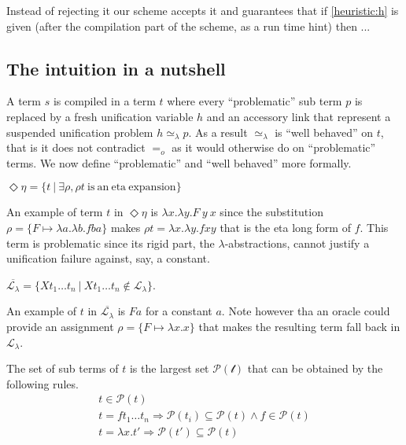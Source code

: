 \documentclass[sigconf,natbib=false,review]{acmart}
\newcommand{\EqualRel}{\ensuremath{=}}
\newcommand{\UnifRel}{\ensuremath{\simeq}}
\newcommand{\Eo}{\ensuremath{\EqualRel_o}\xspace}
\newcommand{\Ue}{\ensuremath{\UnifRel_\lambda}\xspace}
\newcommand{\llambda}{\ensuremath{\mathcal{L}_\lambda}\xspace}
\begin{document}
\noindent
Instead of rejecting it our scheme accepts it and guarantees that if
\ref{heuristic:h} is given (after the compilation part of the scheme, as
a run time hint) then ...


\subsection{The intuition in a nutshell}
\label{sec:nutshell}
A term $s$ is compiled in a term $t$ where every
``problematic'' sub term $p$ is replaced by a fresh unification variable $h$
and an accessory link that represent a suspended unification problem
$h \Ue p$. As a result \Ue is ``well behaved'' on $t$, that is it does not
contradict \Eo as it would otherwise do on ``problematic'' terms.
We now define ``problematic'' and ``well behaved'' more formally.

\newcommand{\maybeeta}{\ensuremath{\Diamond\eta}\xspace}
\newcommand{\maybebeta}{\ensuremath{\overline{\llambda}}\xspace}
\begin{definition}[\maybeeta]
  $\maybeeta = \{ t ~|~ \exists \rho, \rho t ~\mathrm{is~an~eta~expansion} \}$
\end{definition}

\noindent
An example of term $t$ in \maybeeta{} is
$\lambda x.\lambda y.F~y~x$
since the substitution
$\rho = \{ F \mapsto \lambda a.\lambda b.fba\}$
makes $\rho t = \lambda x.\lambda y.f x y$
that is the eta long form of $f$. This term is problematic since
its rigid part, the $\lambda$-abstractions, cannot justify a
unification failure against, say, a constant.

\begin{definition}[\maybebeta]
  $\maybebeta = \{ X t_1 \ldots t_n ~|~ X t_1 \ldots t_n \not\in \llambda \}$.
\end{definition}

\noindent
An example of $t$ in \maybebeta{} is $F a$ for a constant $a$. Note however tha
an oracle could provide an assignment $\rho = \{ F \mapsto \lambda x.x\}$
that makes the resulting term fall back in \llambda.

\newcommand{\subterm}[1]{\ensuremath{\mathcal{P}(#1)}}
\begin{definition}[Subterms \subterm{t}] The set of sub terms of $t$ is the
  largest set $\mathcal{P(t)}$ that can be obtained by the following rules.
$$
\begin{array}{l}
t \in \subterm{t}\\
t = f t_1\ldots t_n \Rightarrow \subterm{t_i} \subseteq \subterm{t} \land f \in \subterm{t}\\
t = \lambda x.t' \Rightarrow \subterm{t'} \subseteq \subterm{t}\\
\end{array}
$$
\end{definition}
\end{document}
